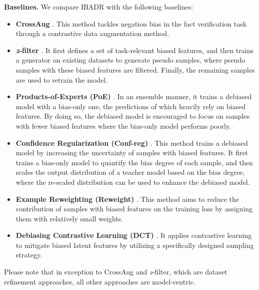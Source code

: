 \documentclass[11pt]{article}
\def\model{\textsc{IBADR}\xspace}
\begin{document}



\indent \textbf{Baselines.}
We compare \model with the following baselines:
\begin{itemize}
    \item  \textbf{CrossAug} \cite{lee2021crossaug}. This method tackles negation bias in the fact verification task through a contrastive data augmentation method.
    \item \textbf{\textit{z}-filter} \cite{wu2022generating}. 
    It first defines a set of task-relevant biased features, and then trains a generator on existing datasets to generate pseudo samples, where pseudo samples with these biased features are filtered. Finally, the remaining samples are used to retrain the model.
    
    \item \textbf{Products-of-Experts (PoE)} \cite{HeZW19_POE,karimi-mahabadi-etal-2020-end}. 
  In an ensemble manner, it trains a debiased model with a bias-only one, the predictions of which heavily rely on biased features. By doing so, the debiased model is encouraged to focus on samples with fewer biased features where the bias-only model performs poorly.
    
    \item \textbf{Confidence Regularization (Conf-reg)} \cite{utama-etal-2020-mind}. This method trains a debiased model by increasing the uncertainty of samples with biased features. It first trains a bias-only model to quantify the bias degree of each sample, and then scales the output distribution of a teacher model based on the bias degree, where the re-scaled distribution can be used to enhance the debiased model.
    
   \item \textbf{Example Reweighting (Reweight)} \cite{schuster-etal-2019-towards}. This method aims to reduce the contribution of samples with biased features on the training loss by assigning them with relatively small weights.
   
   \item \textbf{Debiasing Contrastive Learning (DCT)} \cite{lyu2022feature}. It applies contrastive learning to mitigate biased latent features by utilizing a specifically designed sampling strategy.
\end{itemize}

Please note that in exception to CrossAug and \textit{z}-filter, which are dataset refinement approaches, all other approaches are model-centric.
\end{document}
